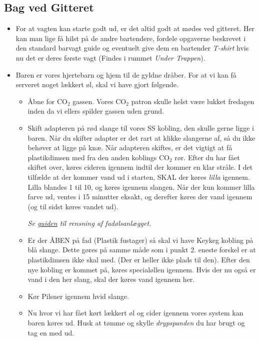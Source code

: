 \subsection{Bag ved Gitteret}
\label{sec:pre:bag-ved-gitteret}
\begin{itemize}
    \item For at vagten kan starte godt ud, er det altid godt at mødes ved gitteret.
    Her kan man lige få hilst på de andre bartendere, fordele opgaverne beskrevet i den standard
    barvagt guide og eventuelt give dem en bartender \textit{T-shirt} hvis nu det er deres første vagt
    (Findes i rummet \textit{Under Trappen}).
    \item Baren er vores hjertebarn og hjem til de gyldne dråber.
    For at vi kan få serveret noget lækkert øl, skal vi have gjort følgende.
    \begin{itemize}
        \item Åbne for CO$_2$ gassen. Vores CO$_2$ patron skulle helst være lukket fredagen
        inden da vi ellers spilder gassen uden grund.
        \item Skift adapteren på rød slange til vores SS kobling, den skulle gerne ligge i baren.
        Når du skifter adapter er det rart at klikke slangerne af, så du ikke behøver at ligge på knæ.
        Når adapteren skiftes, er det vigtigt at få plastikdimsen med fra den anden koblings CO$_2$ rør.
        Efter du har fået skiftet over, køres cideren igennem indtil der kommer en klar stråle.
        I det tilfælde at der kommer vand ud i starten, SKAL der køres \textit{lilla} igennem.
        Lilla blandes 1 til 10, og køres igennem slangen. Når der kun kommer lilla farve ud, ventes i
        15 minutter eksakt, og derefter køres der vand igennem (og til sidst køres vandet ud).
        
        \textit{Se \href{https://media.fredagscafeen.dk/guides/rensningafanlaeg.pdf}{guiden} til rensning af fadølsanlægget.}
        \item Er der ÅBEN på fad (Plastik fustager) så skal vi have Keykeg kobling på blå slange.
        Dette gøres på samme måde som i punkt 2. eneste forskel er at plastikdimsen ikke skal med.
        (Der er heller ikke plads til den).
        Efter den nye kobling er kommet på, køres specialøllen igennem.
        Hvis der nu også er vand i den her slang, skal der køres vand igennem her.
        \item Kør Pilsner igennem hvid slange.
        \item Nu hvor vi har fået kørt lækkert øl og cider igennem vores system kan baren køres ud.
        Husk at tømme og skylle \textit{drypspanden} du har brugt og tag en med ud.
    \end{itemize}
\end{itemize}

